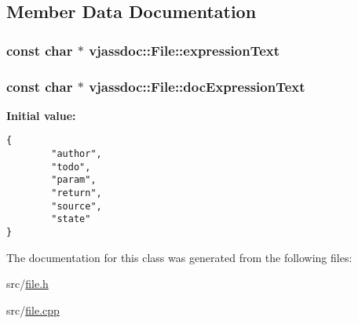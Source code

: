 \subsection{Member Data Documentation}
\hypertarget{classvjassdoc_1_1File_bcc699454548ae47f02ca6cdf6b333ab}{
\subsubsection{\setlength{\rightskip}{0pt plus 5cm}const char $\ast$ {\bf vjassdoc::File::expressionText}}}
\label{classvjassdoc_1_1File_bcc699454548ae47f02ca6cdf6b333ab}


\hypertarget{classvjassdoc_1_1File_399e6e8a31347b0f354727874a825c34}{
\subsubsection{\setlength{\rightskip}{0pt plus 5cm}const char $\ast$ {\bf vjassdoc::File::docExpressionText}}}
\label{classvjassdoc_1_1File_399e6e8a31347b0f354727874a825c34}


\textbf{Initial value:}

\begin{Code}\begin{verbatim}
{
        "author",
        "todo",
        "param",
        "return",
        "source",
        "state"
}
\end{verbatim}
\end{Code}


The documentation for this class was generated from the following files:\begin{CompactItemize}
\item 
src/\hyperlink{file_8h}{file.h}\item 
src/\hyperlink{file_8cpp}{file.cpp}\end{CompactItemize}
